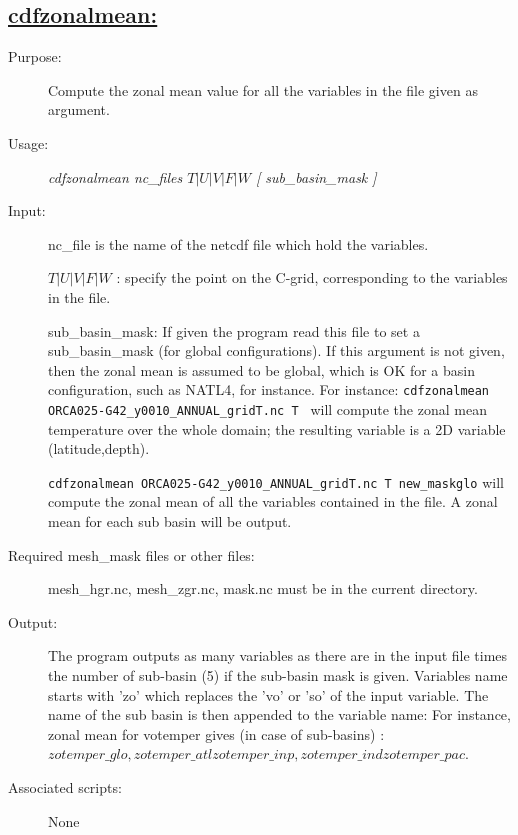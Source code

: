 \documentclass[a4paper,11pt]{article}
\begin{document}
\subsection*{\underline{cdfzonalmean:}}
\begin{description}
\item[Purpose:] Compute the zonal mean value for all the variables in the file given as argument.
\item[Usage:] {\em cdfzonalmean nc\_files   $T | U | V | F | W$ [ sub\_basin\_mask ]}
\item[Input:] nc\_file is the name of the netcdf file which hold the variables. 

$ T | U | V | F | W $ : specify the point on the C-grid, corresponding to the variables in the file.

 sub\_basin\_mask: If given the program read this file to set a sub\_basin\_mask (for global configurations). If this argument
is not given, then the zonal mean is assumed to be global, which is OK for a basin configuration, such as NATL4, for instance.
For instance: {\tt cdfzonalmean  ORCA025-G42\_y0010\_ANNUAL\_gridT.nc T } will compute the zonal mean temperature over
the whole domain; the resulting variable is a 2D variable (latitude,depth).

{\tt cdfzonalmean  ORCA025-G42\_y0010\_ANNUAL\_gridT.nc T new\_maskglo}  will compute the zonal mean of all the variables contained
in the file. A zonal mean for each sub basin will be output.

\item[Required mesh\_mask files or other files:]   mesh\_hgr.nc, mesh\_zgr.nc, mask.nc must be in the current directory.
\item[Output:]  The program outputs as many variables as there are in the input file times the number of sub-basin (5) if the sub-basin
mask is given. Variables name starts with 'zo' which replaces the 'vo' or 'so' of the input variable. The name of the sub basin is then
appended to the variable name: For instance, zonal mean for votemper gives (in case of sub-basins) : $zotemper\_glo, zotemper\_atl
zotemper\_inp, zotemper\_ind zotemper\_pac$. 
\item[Associated scripts:] {None}
\end{description}

\newpage
\end{document}
